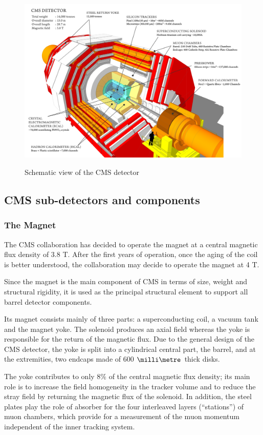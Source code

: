 \begin{figure}[h]
  \centering
\includegraphics[width=15cm]{CMS_chapter_plots/cms_120918_03}
\label{figure}\caption{Schematic view of the CMS detector}
\end{figure}


\subsection{CMS sub-detectors and components}

\subsubsection{The Magnet}

The CMS collaboration has decided to operate the magnet at a central magnetic flux density
of 3.8 T. After the first years of operation, once the aging of the coil is better understood, the
collaboration may decide to operate the magnet at 4 T.

Since the magnet is the main component of CMS in terms of size, weight and structural
rigidity, it is used as the principal structural element to support all barrel detector components.


Its magnet consists mainly of three parts: a superconducting coil, a vacuum tank and the magnet yoke. The solenoid produces an axial field whereas the yoke is responsible for the return of the magnetic flux. Due to the general design of the CMS detector, the yoke is split into a cylindrical central part, the barrel, and at the extremities, two endcaps made of 600 $\mm$ thick disks.


The yoke contributes to only 8$\%$ of the central magnetic flux density; its main role
is to increase the field homogeneity in the tracker volume and to reduce the stray field by returning
the magnetic flux of the solenoid. In addition, the steel plates play the role of absorber for the four
interleaved layers (“stations”) of muon chambers, which provide for a measurement of the muon
momentum independent of the inner tracking system.




